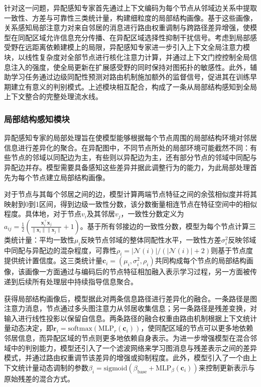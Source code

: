 \documentclass[a4paper,10pt]{article}
\begin{document}
针对这一问题，异配感知专家首先通过上下文编码为每个节点从邻域边关系中提取一致性、方差与可靠性三类统计量，构建细粒度的局部结构画像。基于这些画像，关系感知局部注意力对来自邻居的消息进行路由权重调制与跨路径差异增强，使模型在同配区域允许信息充分传播、在异配区域选择性抑制干扰信号。考虑到局部感受野在远距离依赖建模上的局限，异配感知专家进一步引入上下文全局注意力模块，以线性复杂度对全部节点进行核化注意力计算，并通过上下文门控控制全局信息注入的强度，使全局更新在扩展感受野的同时保持对图拓扑的敏感性。此外，辅助学习任务通过边级同配性预测对路由机制施加额外的监督信号，促进其在训练早期建立有意义的判别模式。上述模块相互配合，构成了一条从局部结构感知到全局上下文整合的完整处理流水线。

\subsubsection{局部结构感知模块}

异配感知专家的局部处理旨在使模型能够根据每个节点周围的局部结构环境对邻居信息进行差异化的聚合。在异配图中，不同节点所处的局部环境可能截然不同：有些节点的邻域以同配边为主，有些则以异配边为主，还有部分节点的邻域中同配与异配边并存。模型需要具备感知这些差异并据此调整行为的能力，为此局部处理首先为每个节点建立局部结构画像。

对于节点与其每个邻居之间的边，模型计算两端节点特征之间的余弦相似度并将其映射到0到1区间，得到边级一致性分数，该分数衡量相连节点在特征空间中的相似程度。具体地，对于节点$v_i$及其邻居$v_j$，一致性分数定义为$a_{ij}=\frac{1}{2}\left(\frac{\mathbf{x}_i^\top\mathbf{x}_j}{\|\mathbf{x}_i\|\|\mathbf{x}_j\|}+1\right)$。基于所有邻接边的一致性分数，模型为每个节点计算三类统计量：平均一致性$\mu_i$反映节点邻域的整体同配性水平，一致性方差$\sigma_i^2$反映邻域中同配与异配边的混杂程度，可靠性$\rho_i=|\mathcal{N}(i)|/(|\mathcal{N}(i)|+2)$则基于节点度提供统计置信度。这三类统计量$\mathbf{c}_i=(\mu_i,\sigma_i^2,\rho_i)$共同构成每个节点的局部结构画像，该画像一方面通过与编码后的节点特征相加融入表示学习过程，另一方面被传递到后续所有处理层中持续指导信息聚合。

获得局部结构画像后，模型据此对两条信息路径进行差异化的融合。一条路径是图注意力消息，节点通过多头图注意力从邻居收集信息；另一条路径是残差变换，对输入进行线性投影以保留自信息。两条路径的融合权重由路由机制根据上下文统计量动态决定，即$\mathbf{r}_i=\text{softmax}(\text{MLP}_r(\mathbf{c}_i))$，使同配区域的节点可以更多地依赖邻居信息，而异配区域的节点则更多地依赖自身表示。为进一步增强模型在混合邻域中的判别能力，模型还引入了一个滤波网络来学习图消息与残差表示之间的差异模式，并通过路由权重调节该差异的增强或抑制程度。此外，模型引入了一个由上下文统计量动态调制的参数$\beta_i=\text{sigmoid}(\beta_{\text{base}}+\text{MLP}_\beta(\mathbf{c}_i))$来控制更新表示与原始残差的混合方式。
\end{document}
